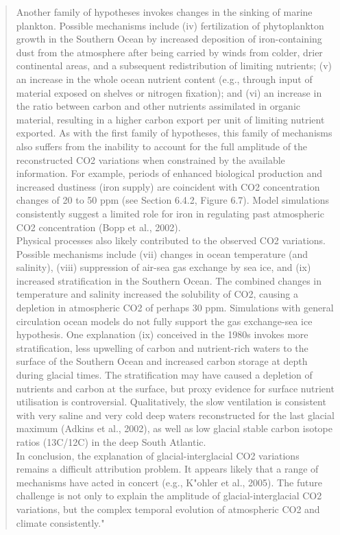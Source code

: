 \begin{quotation}
	Another family of hypotheses invokes changes in the sinking of marine plankton. Possible mechanisms include (iv) fertilization of phytoplankton growth in the Southern Ocean by increased deposition of iron-containing dust from the atmosphere after being carried by winds from colder, drier continental areas, and a subsequent redistribution of limiting nutrients; (v) an increase in the whole ocean nutrient content (e.g., through input of material exposed on shelves or nitrogen fixation); and (vi) an increase in the ratio between carbon and other nutrients assimilated in organic material, resulting in a higher carbon export per unit of limiting nutrient exported. As with the first family of hypotheses, this family of mechanisms also suffers from the inability to account for the full amplitude of the reconstructed CO2 variations when constrained by the available information. For example, periods of enhanced biological production and increased dustiness (iron supply) are coincident with CO2 concentration changes of 20 to 50 ppm (see Section 6.4.2, Figure 6.7). Model simulations consistently suggest a limited role for iron in regulating past atmospheric CO2 concentration (Bopp et al., 2002).\\
	Physical processes also likely contributed to the observed CO2 variations. Possible mechanisms include (vii) changes in ocean temperature (and salinity), (viii) suppression of air-sea gas exchange by sea ice, and (ix) increased stratification in the Southern Ocean. The combined changes in temperature and salinity increased the solubility of CO2, causing a depletion in atmospheric CO2 of perhaps 30 ppm. Simulations with general circulation ocean models do not fully support the gas exchange-sea ice hypothesis. One explanation (ix) conceived in the 1980s invokes more stratification, less upwelling of carbon and nutrient-rich waters to the surface of the Southern Ocean and increased carbon storage at depth during glacial times. The stratification may have caused a depletion of nutrients and carbon at the surface, but proxy evidence for surface nutrient utilisation is controversial. Qualitatively, the slow ventilation is consistent with very saline and very cold deep waters reconstructed for the last glacial maximum (Adkins et al., 2002), as well as low glacial stable carbon isotope ratios (13C/12C) in the deep South Atlantic.\\
	In conclusion, the explanation of glacial-interglacial CO2 variations remains a difficult attribution problem. It appears likely that a range of mechanisms have acted in concert (e.g., K"ohler et al., 2005). The future challenge is not only to explain the amplitude of glacial-interglacial CO2 variations, but the complex temporal evolution of atmospheric CO2 and climate consistently."
\end{quotation}

